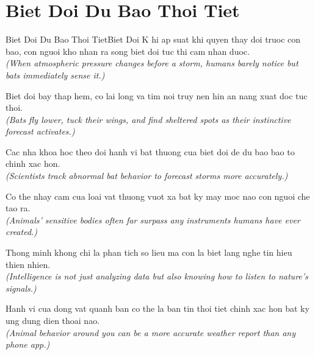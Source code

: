 \section{Biet Doi Du Bao Thoi Tiet}
\begin{truyen}{Biet Doi Du Bao Thoi Tiet}{Biet Doi}
K hi ap suat khi quyen thay doi truoc con bao, con nguoi kho nhan ra song biet doi tuc thi cam nhan duoc.\\
\textit{(When atmospheric pressure changes before a storm, humans barely notice but bats immediately sense it.)}

Biet doi bay thap hem, co lai long va tim noi truy nen hin an nang xuat doc tuc thoi.\\
\textit{(Bats fly lower, tuck their wings, and find sheltered spots as their instinctive forecast activates.)}

Cac nha khoa hoc theo doi hanh vi bat thuong cua biet doi de du bao bao to chinh xac hon.\\
\textit{(Scientists track abnormal bat behavior to forecast storms more accurately.)}

Co the nhay cam cua loai vat thuong vuot xa bat ky may moc nao con nguoi che tao ra.\\
\textit{(Animals' sensitive bodies often far surpass any instruments humans have ever created.)}

Thong minh khong chi la phan tich so lieu ma con la biet lang nghe tin hieu thien nhien.\\
\textit{(Intelligence is not just analyzing data but also knowing how to listen to nature's signals.)}

\end{truyen}
\begin{baihoc}
  Hanh vi cua dong vat quanh ban co the la ban tin thoi tiet chinh xac hon bat ky ung dung dien thoai nao.\\
  \textit{(Animal behavior around you can be a more accurate weather report than any phone app.)}
\end{baihoc}

